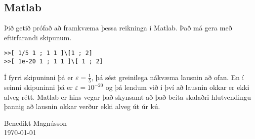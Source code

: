 \documentclass[14pt,a4paper]{article}
\renewcommand{\epsilon}{\varepsilon}
\begin{document}
\subsection*{Matlab}
Þið getið prófað að framkvæma þessa reikninga í Matlab. Það má gera með eftirfarandi
skipunum.
\begin{verbatim}
>>[ 1/5 1 ; 1 1 ]\[1 ; 2]
>>[ 1e-20 1 ; 1 1 ]\[ 1 ; 2]
\end{verbatim}
Í fyrri skipuninni þá er $\epsilon = \frac 15$, þá sést greinilega nákvæma lausnin að ofan.
En í seinni skipuninni þá er $\epsilon = 10^{-20}$ og þá lendum við í því að lausnin okkar
er ekki alveg rétt. Matlab er hins vegar það skynsamt að það beita skalaðri hlutvendingu
þannig að lausnin okkar verður ekki alveg út úr kú.

\bigskip
\begin{flushright}
 Benedikt Magnússon\\
 \today
\end{flushright}
\end{document}
